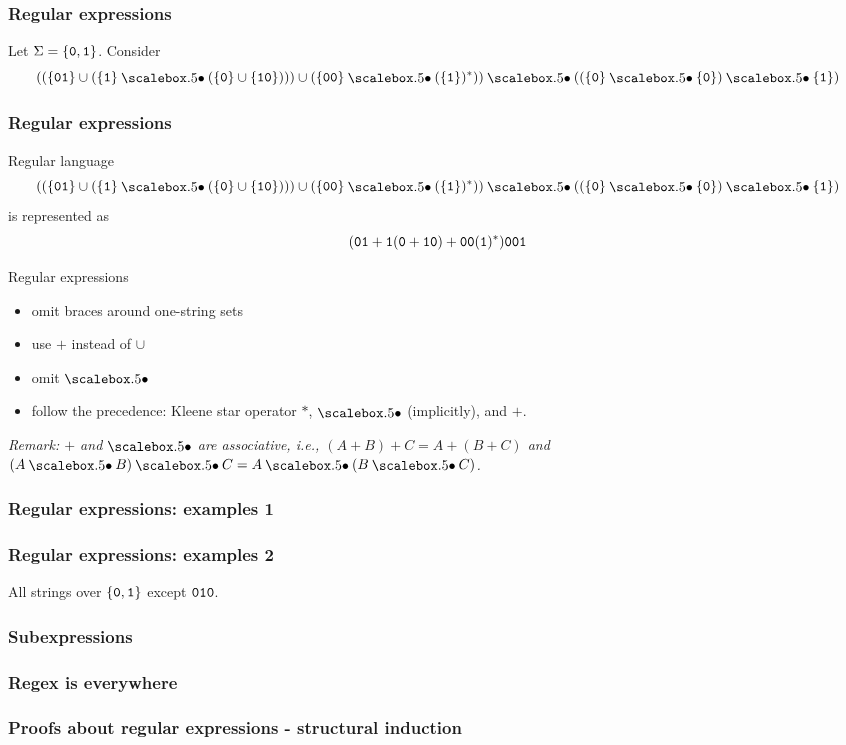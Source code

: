 \begin{frame}
  \frametitle{Regular expressions}
  Let $\Sigma=\{{\mathtt 0},{\mathtt 1}\}$.  Consider
  \[
  (
  (\{\czero\cone\}\cup
  (\{\cone\}\sbullet(\{\czero\}\cup\{\cone\czero\})))
  \cup
  (\{\czero\czero\}\sbullet(\{\cone\})^*)
  )
  \sbullet((\{\czero\}\sbullet\{\czero\})\sbullet\{\cone\})
  \]
  \vspace{2in}
\end{frame}

\begin{frame}
  \frametitle{Regular expressions}
  Regular language
  \[
  (
  (\{\czero\cone\}\cup
  (\{\cone\}\sbullet(\{\czero\}\cup\{\cone\czero\})))
  \cup
  (\{\czero\czero\}\sbullet(\{\cone\})^*)
  )
  \sbullet((\{\czero\}\sbullet\{\czero\})\sbullet\{\cone\})
  \]
  is represented as
  \[
  (
  {\mathtt 0}{\mathtt 1}+
  {\mathtt 1}({\mathtt 0}+{\mathtt 1}{\mathtt 0})
  +{\mathtt 0}{\mathtt 0}({\mathtt 1})^*
  )
  {\mathtt 0}{\mathtt 0}{\mathtt 1}
  \]

  Regular expressions
  \begin{itemize}
  \item omit braces around one-string sets
  \item use $+$ instead of $\cup$
  \item omit $\sbullet$
  \item follow the precedence: Kleene star operator $*$, $\sbullet$ (implicitly), and $+$.
  \end{itemize}

  {\em
    Remark: $+$ and $\sbullet$ are associative, i.e., $(A+B)+C=A+(B+C)$ and $(A\sbullet B)\sbullet C=A\sbullet(B\sbullet C)$.
  }
\end{frame}

\begin{frame}
  \frametitle{Regular expressions: examples 1}
\end{frame}

\begin{frame}
  \frametitle{Regular expressions: examples 2}
  All strings over $\{{\mathtt 0},{\mathtt 1}\}$ except ${\mathtt 0}{\mathtt 1}{\mathtt 0}$.
  \vspace{3in}
\end{frame}

\begin{frame}
  \frametitle{Subexpressions}
\end{frame}

\begin{frame}
  \frametitle{Regex is everywhere}
\end{frame}

\begin{frame}
  \frametitle{Proofs about regular expressions - structural induction} 
\end{frame}

